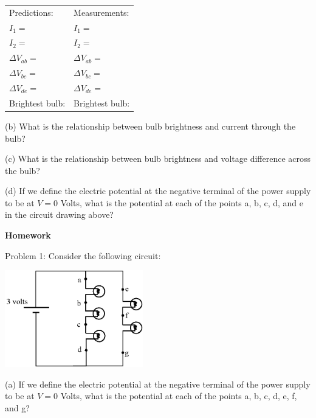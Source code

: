 \vspace{0.1 in}
\renewcommand{\arraystretch}{1.6}
\hspace*{0.5in}
\begin{tabular}{l l}
Predictions: \hspace{0.7in} & Measurements: \\
$I_1 =$ & $I_1 =$ \\
$I_2 =$ & $I_2 =$ \\
$\Delta V_{ab} =$ & $\Delta V_{ab} =$ \\
$\Delta V_{bc} =$ & $\Delta V_{bc} =$ \\
$\Delta V_{de} =$ & $\Delta V_{de} =$ \\
Brightest bulb: & Brightest bulb: \\
\end{tabular}
\renewcommand{\arraystretch}{1.0}
\vspace{0.3in}

(b) What is the relationship between bulb brightness and current through the bulb?
\answerspace{0.5 in}

(c) What is the relationship between bulb brightness and voltage difference across the bulb?
\answerspace{0.5 in}

\pagebreak[2]
(d) If we define the electric potential at the negative terminal of the power supply to be at $V=0$ Volts, what is the potential at each of the points a, b, c, d, and e in the circuit drawing above?  
\answerspace{0.6 in}

\textbf{Homework}

Problem 1: Consider the following circuit:

\begin{center}
\includegraphics[width=0.45\textwidth]{electric_circuits/circ_diag6.eps}
\end{center}
\vspace{-0.1in}

(a) If we define the electric potential at the negative terminal of the power supply to be at $V=0$ Volts, what is the potential at each of the points a, b, c, d, e, f, and g?  
\answerspace{0.7 in}

